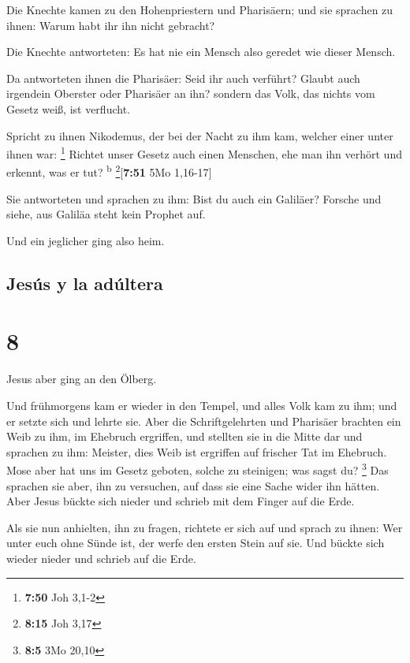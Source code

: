  Die Knechte kamen zu den Hohenpriestern und Pharisäern;
und sie sprachen zu ihnen: Warum habt ihr ihn nicht gebracht?

 Die Knechte antworteten: Es hat nie ein Mensch also
geredet wie dieser Mensch.

 Da antworteten ihnen die Pharisäer: Seid ihr auch
verführt?  Glaubt auch irgendein Oberster oder Pharisäer
an ihn?  sondern das Volk, das nichts vom Gesetz weiß,
ist verflucht.

 Spricht zu ihnen Nikodemus, der bei der Nacht zu ihm
kam, welcher einer unter ihnen war: \footnote{\textbf{7:50} Joh 3,1-2}
 Richtet unser Gesetz auch einen Menschen, ehe man ihn
verhört und erkennt, was er tut? \textsuperscript{b}
\footnote{\textbf{8:15} Joh 3,17}{[}\textbf{7:51} 5Mo 1,16-17{]}

 Sie antworteten und sprachen zu ihm: Bist du auch ein
Galiläer? Forsche und siehe, aus Galiläa steht kein Prophet auf.

 Und ein jeglicher ging also heim.

\hypertarget{jesuxfas-y-la-aduxfaltera}{%
\subsection{Jesús y la adúltera}\label{jesuxfas-y-la-aduxfaltera}}

\hypertarget{section-7}{%
\section{8}\label{section-7}}

 Jesus aber ging an den Ölberg.

 Und frühmorgens kam er wieder in den Tempel, und alles
Volk kam zu ihm; und er setzte sich und lehrte sie.  Aber
die Schriftgelehrten und Pharisäer brachten ein Weib zu ihm, im Ehebruch
ergriffen, und stellten sie in die Mitte dar  und sprachen
zu ihm: Meister, dies Weib ist ergriffen auf frischer Tat im Ehebruch.
 Mose aber hat uns im Gesetz geboten, solche zu steinigen;
was sagst du? \footnote{\textbf{8:5} 3Mo 20,10}  Das
sprachen sie aber, ihn zu versuchen, auf dass sie eine Sache wider ihn
hätten. Aber Jesus bückte sich nieder und schrieb mit dem Finger auf die
Erde.

 Als sie nun anhielten, ihn zu fragen, richtete er sich
auf und sprach zu ihnen: Wer unter euch ohne Sünde ist, der werfe den
ersten Stein auf sie.  Und bückte sich wieder nieder und
schrieb auf die Erde.

